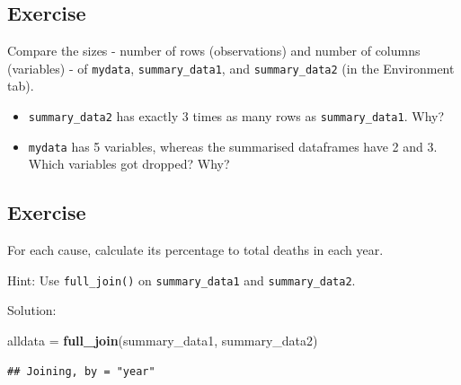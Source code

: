 \documentclass[]{book}
\makeatletter
\newenvironment{Shaded}{\begin{snugshade}}{\end{snugshade}}
\newcommand{\DecValTok}[1]{\textcolor[rgb]{0.00,0.00,0.81}{#1}}
\newcommand{\KeywordTok}[1]{\textcolor[rgb]{0.13,0.29,0.53}{\textbf{#1}}}
\newcommand{\NormalTok}[1]{#1}
\newcommand{\OperatorTok}[1]{\textcolor[rgb]{0.81,0.36,0.00}{\textbf{#1}}}
\newcommand{\StringTok}[1]{\textcolor[rgb]{0.31,0.60,0.02}{#1}}
\providecommand{\tightlist}{%
  \setlength{\itemsep}{0pt}\setlength{\parskip}{0pt}}
\newenvironment{kframe}{%
\medskip{}
\setlength{\fboxsep}{.8em}
 \def\at@end@of@kframe{}%
 \ifinner\ifhmode%
  \def\at@end@of@kframe{\end{minipage}}%
  \begin{minipage}{\columnwidth}%
 \fi\fi%
 \def\FrameCommand##1{\hskip\@totalleftmargin \hskip-\fboxsep
 \colorbox{shadecolor}{##1}\hskip-\fboxsep
     \hskip-\linewidth \hskip-\@totalleftmargin \hskip\columnwidth}%
 \MakeFramed {\advance\hsize-\width
   \@totalleftmargin\z@ \linewidth\hsize
   \@setminipage}}%
 {\par\unskip\endMakeFramed%
 \at@end@of@kframe}
\renewenvironment{Shaded}{\begin{kframe}}{\end{kframe}}
\theoremstyle{definition}
\theoremstyle{definition}
\theoremstyle{definition}
\theoremstyle{remark}
\makeatother
\begin{document}
\hypertarget{exercise-11}{%
\subsection{Exercise}\label{exercise-11}}

Compare the sizes - number of rows (observations) and number of columns
(variables) - of \texttt{mydata}, \texttt{summary\_data1}, and
\texttt{summary\_data2} (in the Environment tab).

\begin{itemize}
\tightlist
\item
  \texttt{summary\_data2} has exactly 3 times as many rows as
  \texttt{summary\_data1}. Why?
\item
  \texttt{mydata} has 5 variables, whereas the summarised dataframes
  have 2 and 3. Which variables got dropped? Why?
\end{itemize}

\hypertarget{exercise-12}{%
\subsection{Exercise}\label{exercise-12}}

For each cause, calculate its percentage to total deaths in each year.

Hint: Use \texttt{full\_join()} on \texttt{summary\_data1} and
\texttt{summary\_data2}.

Solution:

\begin{Shaded}
\begin{Highlighting}[]
\NormalTok{alldata =}\StringTok{ }\KeywordTok{full_join}\NormalTok{(summary_data1, summary_data2)}
\end{Highlighting}
\end{Shaded}

\begin{verbatim}
## Joining, by = "year"
\end{verbatim}

\begin{Shaded}
\end{Shaded}
\end{document}
